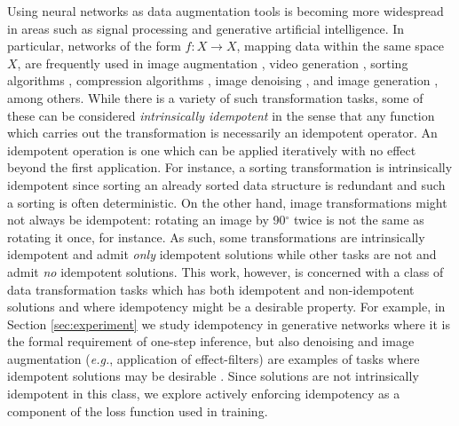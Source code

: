 \documentclass{article}
\theoremstyle{plain}
\theoremstyle{definition}
\theoremstyle{remark}
\begin{document}
Using neural networks as data augmentation tools is becoming more widespread in areas such as signal processing and generative artificial intelligence. In particular, networks of the form ${f: X \to X}$, mapping data within the same space $X$, are frequently used in image augmentation \cite{lu-image-aug}, video generation \cite{ma-compression, liu-gans}, sorting algorithms \cite{tambouratzis-sorting}, compression algorithms \cite{namphol-compression, liu-gans}, image denoising \cite{mao-deblurring, ilesanmi-denoising, liu-gans}, and image generation \cite{liu-gans}, among others. While there is a variety of such transformation tasks, some of these can be considered \textit{intrinsically idempotent} in the sense that any function which carries out the transformation is necessarily an idempotent operator. An idempotent operation is one which can be applied iteratively with no effect beyond the first application. For instance, a sorting transformation is intrinsically idempotent since sorting an already sorted data structure is redundant and such a sorting is often deterministic. On the other hand, image transformations might not always be idempotent: rotating an image by 90$^{\circ}$ twice is not the same as rotating it once, for instance. As such, some transformations are intrinsically idempotent and admit \textit{only} idempotent solutions while other tasks are not and admit \textit{no} idempotent solutions. This work, however, is concerned with a class of data transformation tasks which has both idempotent and non-idempotent solutions and where idempotency might be a desirable property. For example, in Section \ref{sec:experiment} we study idempotency in generative networks where it is the formal requirement of one-step inference, but also denoising and image augmentation (\textit{e.g.}, application of effect-filters) are examples of tasks where idempotent solutions may be desirable \cite{mao-deblurring,liu-gans}. Since solutions are not intrinsically idempotent in this class, we explore actively enforcing idempotency as a component of the loss function used in training.
\end{document}
